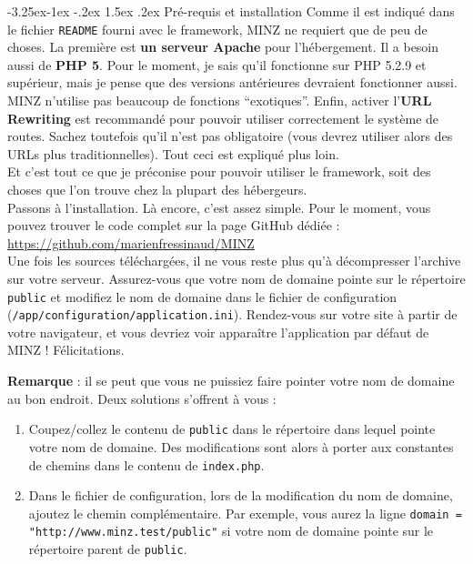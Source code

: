 \documentclass[a4paper,11pt]{article}
\makeatletter
\renewcommand{\subsection}{\@startsection{subsection}{2}{\z@}%
             {-3.25ex\@plus -1ex \@minus -.2ex}%
             {1.5ex \@plus .2ex}%
             {\color{bleuFonce}\normalfont\large\bfseries}}
\makeatother
\begin{document}
\subsection{Pré-requis et installation}
Comme il est indiqué dans le fichier \texttt{README} fourni avec le framework, MINZ ne requiert que de peu de choses. La première est \textbf{un serveur Apache} pour l'hébergement. Il a besoin aussi de \textbf{PHP 5}. Pour le moment, je sais qu'il fonctionne sur PHP 5.2.9 et supérieur, mais je pense que des versions antérieures devraient fonctionner aussi. MINZ n'utilise pas beaucoup de fonctions ``exotiques''. Enfin, activer l'\textbf{URL Rewriting} est recommandé pour pouvoir utiliser correctement le système de routes. Sachez toutefois qu'il n'est pas obligatoire (vous devrez utiliser alors des URLs plus traditionnelles). Tout ceci est expliqué plus loin.\\
Et c'est tout ce que je préconise pour pouvoir utiliser le framework, soit des choses que l'on trouve chez la plupart des hébergeurs.\\

Passons à l'installation. Là encore, c'est assez simple. Pour le moment, vous pouvez trouver le code complet sur la page GitHub dédiée :\\ \url{https://github.com/marienfressinaud/MINZ}\\

Une fois les sources téléchargées, il ne vous reste plus qu'à décompresser l'archive sur votre serveur. Assurez-vous que votre nom de domaine pointe sur le répertoire \texttt{public} et modifiez le nom de domaine dans le fichier de configuration (\texttt{/app/configuration/application.ini}). Rendez-vous sur votre site à partir de votre navigateur, et vous devriez voir apparaître l'application par défaut de MINZ ! Félicitations.\\

\textcolor{grisFonce}{\textbf{Remarque} : il se peut que vous ne puissiez faire pointer votre nom de domaine au bon endroit. Deux solutions s'offrent à vous :
\begin{enumerate}
  \item Coupez/collez le contenu de \texttt{public} dans le répertoire dans lequel pointe votre nom de domaine. Des modifications sont alors à porter aux constantes de chemins dans le contenu de \texttt{index.php}.
  \item Dans le fichier de configuration, lors de la modification du nom de domaine, ajoutez le chemin complémentaire. Par exemple, vous aurez la ligne \texttt{domain = "http://www.minz.test/public"} si votre nom de domaine pointe sur le répertoire parent de \texttt{public}.
\end{enumerate}
}
\end{document}
